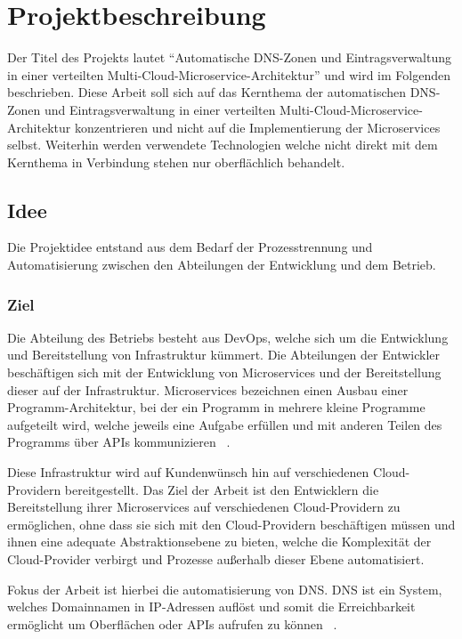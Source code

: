 \chapter{Projektbeschreibung}
\label{ch:description}
Der Titel des Projekts lautet \enquote{Automatische DNS-Zonen und Eintragsverwaltung in einer verteilten Multi-Cloud-Microservice-Architektur} und wird im Folgenden beschrieben.
Diese Arbeit soll sich auf das Kernthema der automatischen DNS-Zonen und Eintragsverwaltung in einer verteilten Multi-Cloud-Microservice-Architektur konzentrieren und nicht auf die Implementierung der Microservices selbst.
Weiterhin werden verwendete Technologien welche nicht direkt mit dem Kernthema in Verbindung stehen nur oberflächlich behandelt.

\section{Idee}
\label{sec:description:projektidee}
Die Projektidee entstand aus dem Bedarf der Prozesstrennung und Automatisierung zwischen den Abteilungen der Entwicklung und dem Betrieb.

\subsection{Ziel}
\label{subsec:description:ziel}
Die Abteilung des Betriebs besteht aus \ac{DevOps}, welche sich um die Entwicklung und Bereitstellung von Infrastruktur kümmert.
Die Abteilungen der Entwickler beschäftigen sich mit der Entwicklung von Microservices und der Bereitstellung dieser auf der Infrastruktur.
Microservices bezeichnen einen Ausbau einer Programm-Architektur, bei der ein Programm in mehrere kleine Programme aufgeteilt wird, welche jeweils eine Aufgabe erfüllen und mit anderen Teilen des Programms über \ac{API}s kommunizieren ~\cite{redhead-kubernetes:2023}.
\medskip

Diese Infrastruktur wird auf Kundenwünsch hin auf verschiedenen Cloud-Providern bereitgestellt.
Das Ziel der Arbeit ist den Entwicklern die Bereitstellung ihrer Microservices auf verschiedenen Cloud-Providern zu ermöglichen, ohne dass sie sich mit den Cloud-Providern beschäftigen müssen
und ihnen eine adequate Abstraktionsebene zu bieten, welche die Komplexität der Cloud-Provider verbirgt und Prozesse außerhalb dieser Ebene automatisiert.
\medskip

Fokus der Arbeit ist hierbei die automatisierung von \ac{DNS}.
DNS ist ein System, welches Domainnamen in IP-Adressen auflöst und somit die Erreichbarkeit ermöglicht um Oberflächen oder APIs aufrufen zu können ~\cite{klensin2003role}.
\medskip

